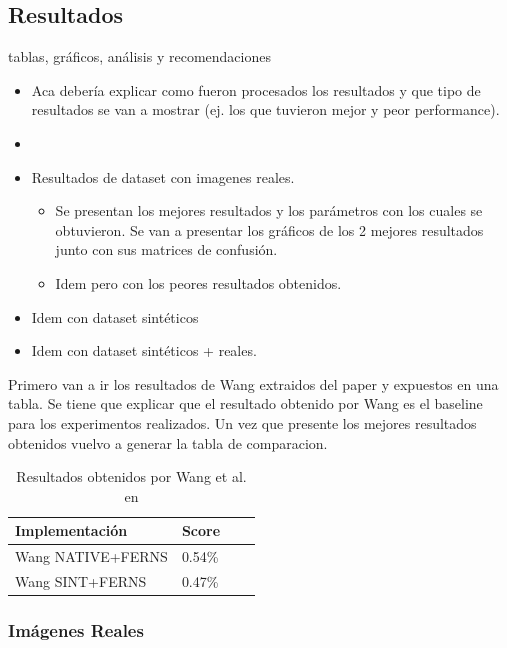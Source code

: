 \newpage
\subsection{Resultados}
\label{subsection:resultados}
	tablas, gráficos, análisis y recomendaciones
	\begin{itemize}
		\item Aca debería explicar como fueron procesados los
                  resultados y que tipo de resultados se van a mostrar (ej. los
                  que tuvieron mejor y peor performance). 
                \item {}
		\item Resultados de dataset con imagenes reales.
		\begin{itemize}
			\item Se presentan los mejores resultados y los parámetros con los cuales se obtuvieron. Se van a presentar los gráficos de los 2 mejores resultados junto con sus matrices de confusión.
			\item Idem pero con los peores resultados obtenidos.
		\end{itemize}
		\item Idem con dataset sintéticos
		\item Idem con dataset sintéticos + reales.

	\end{itemize}
	
	Primero van a ir los resultados de Wang extraidos del paper y expuestos en una tabla. Se tiene que explicar que el resultado obtenido por Wang es el baseline para los experimentos realizados. Un vez que presente los mejores resultados obtenidos vuelvo a generar la tabla de comparacion.
	
	\begin{table}
		\centering
	    \begin{tabular}{ | l | l | l | p{5cm} |}
    			\hline
    				\textbf{Implementación} & \textbf{Score} \\ \hline
    				Wang NATIVE+FERNS & 0.54\% \\ \hline
    				Wang SINT+FERNS & 0.47\% \\
    			\hline
    		\end{tabular}	
    		\caption{Resultados obtenidos por Wang et al. en \cite{wang}}
	\end{table}

	\subsubsection{Imágenes Reales}
	
